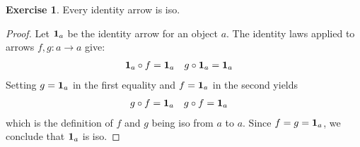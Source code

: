 \documentclass[10pt,a4paper,twoside]{article}
\newcommand{\aname}[1]{{\normalfont\textbf{#1}}}
\newcommand{\Id}{\aname{1}}
\theoremstyle{definition}
\newcounter{excounter}
\newtheorem{exercise}[excounter]{Exercise}
\begin{document}
\begin{exercise}

  Every identity arrow is iso.

\end{exercise}

\begin{proof}

  Let $\Id_a$ be the identity arrow for an object $a$. The identity laws applied to arrows $f, g \colon a \to a$ give:
  \begin{align*}
    \Id_a \circ f = \Id_a &\quad g \circ \Id_a = \Id_a
  \end{align*}
  Setting $g = \Id_a$ in the first equality and $f = \Id_a$ in the second yields
  \begin{align*}
    g \circ f = \Id_a &\quad g \circ f = \Id_a
  \end{align*}
  which is the definition of $f$ and $g$ being iso from $a$ to $a$. Since $f = g = \Id_a$, we conclude that $\Id_a$ is iso.

\end{proof}
\end{document}

